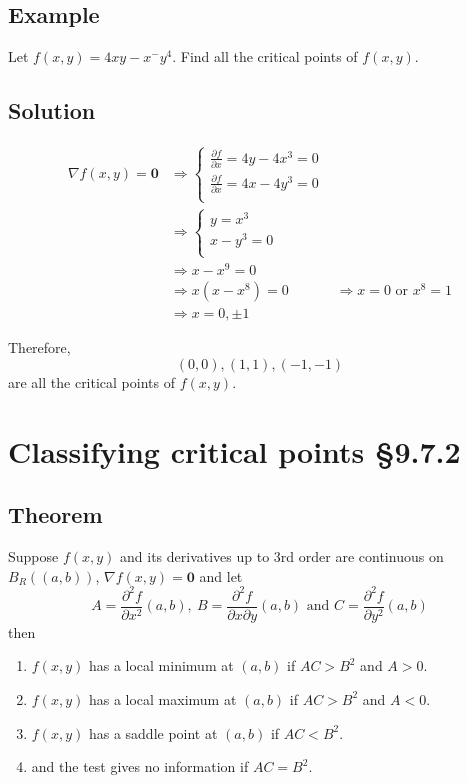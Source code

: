 \documentclass[11pt]{article}
\renewcommand{\vec}[1]{\mathbf{#1}}
\begin{document}
\subsection{Example}
Let $f(x, y) = 4xy - x^ - y^4$. Find all the critical points of $f(x, y)$. 

\subsection{Solution}
\begin{align*}
\nabla f(x, y) = \vec{0} &\Rightarrow \left\{ \begin{array}{c}
\frac{\partial f}{\partial x} = 4y - 4x^3 = 0 \\
\frac{\partial f}{\partial x} = 4x - 4y^3 = 0 \\
\end{array} \right. \\
&\Rightarrow \left\{ \begin{array}{c}
y = x^3 \\
x - y^3 = 0 \\
\end{array} \right. \\
&\Rightarrow x - x^9 = 0 \\
&\Rightarrow x(x - x^8) = 0
&\Rightarrow x = 0 \text{ or } x^8 = 1 \\
&\Rightarrow x=0, \pm 1
\end{align*}

Therefore,
\[ (0, 0), (1, 1), (-1, -1) \]
are all the critical points of $f(x, y)$.

\section{Classifying critical points §9.7.2}
\subsection{Theorem}
Suppose $f(x, y)$ and its derivatives up to 3rd order are continuous on $B_R((a, b))$, $\nabla f(x, y) = \vec{0}$ and let
\[ A = \frac{\partial^2 f}{\partial x^2}(a, b),\ B = \frac{\partial^2 f}{\partial x \partial y}(a, b) \text{ and } C = \frac{\partial^2 f}{\partial y^2}(a, b) \]
then
\begin{enumerate}[ (i) ]
\item $f(x, y)$ has a local minimum at $(a, b)$ if $AC > B^2$ and $A > 0$.
\item $f(x, y)$ has a local maximum at $(a, b)$ if $AC > B^2$ and $A < 0$.
\item $f(x, y)$ has a saddle point at $(a, b)$ if $AC < B^2$.
\item and the test gives no information if $AC = B^2$.
\end{enumerate}
\end{document}
